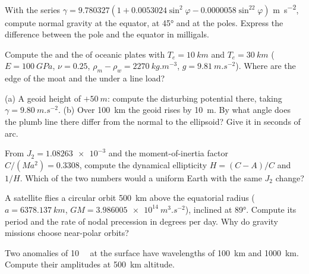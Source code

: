 \begin{exercise}[$\star$]\label{exo:b3:gravity-geodesy:3}
With the series $\gamma = 9.780327(1 + 0.0053024\sin^2\varphi -
0.0000058\sin^22\varphi)$ \unit{m.s^{-2}}, compute normal gravity at the
equator, at \ang{45} and at the poles. Express the difference between the pole
and the equator in milligals.
\end{exercise}

\begin{exercise}[$\star$]\label{exo:b3:gravity-geodesy:4}
Compute the  and the  of oceanic plates with
$T_e = \qty{10}{km}$ and $T_e = \qty{30}{km}$ ($E = \qty{100}{GPa}$,
$\nu = 0.25$, $\rho_m - \rho_w = \qty{2270}{kg.m^{-3}}$, $g =
\qty{9.81}{m.s^{-2}}$). Where are the edge of the moat and the  under a
line load?
\end{exercise}

\begin{exercise}[$\star\star$]\label{exo:b3:gravity-geodesy:5}
(a) A geoid height of $+\qty{50}{m}$: compute the disturbing potential there,
taking $\gamma = \qty{9.80}{m.s^{-2}}$. (b) Over \qty{100}{km} the geoid rises
by \qty{10}{m}. By what angle does the plumb line there differ from the normal to
the ellipsoid? Give it in seconds of arc.
\end{exercise}

\begin{exercise}[$\star\star$]\label{exo:b3:gravity-geodesy:6}
From $J_2 = \num{1.08263e-3}$ and the moment-of-inertia factor
$C/(Ma^2) = \num{0.3308}$, compute the dynamical ellipticity $H = (C - A)/C$ and
$1/H$. Which of the two numbers would a uniform Earth with the same $J_2$ change?
\end{exercise}

\begin{exercise}[$\star\star$]\label{exo:b3:gravity-geodesy:7}
A satellite flies a circular orbit \qty{500}{km} above the equatorial radius
($a = \qty{6378.137}{km}$, $GM = \qty{3.986005e14}{m^3.s^{-2}}$), inclined at
\ang{89}. Compute its period and the rate of nodal precession in degrees per day.
Why do gravity missions choose near-polar orbits?
\end{exercise}

\begin{exercise}[$\star\star$]\label{exo:b3:gravity-geodesy:8}
Two anomalies of \qty{10}{\milli\gal} at the surface have wavelengths of
\qty{100}{km} and \qty{1000}{km}. Compute their amplitudes at \qty{500}{km}
altitude.
\end{exercise}

